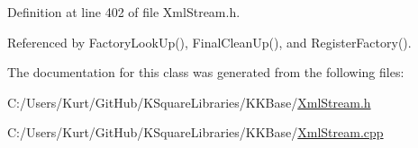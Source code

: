 Definition at line 402 of file Xml\+Stream.\+h.



Referenced by Factory\+Look\+Up(), Final\+Clean\+Up(), and Register\+Factory().



The documentation for this class was generated from the following files\+:\begin{DoxyCompactItemize}
\item 
C\+:/\+Users/\+Kurt/\+Git\+Hub/\+K\+Square\+Libraries/\+K\+K\+Base/\hyperlink{_xml_stream_8h}{Xml\+Stream.\+h}\item 
C\+:/\+Users/\+Kurt/\+Git\+Hub/\+K\+Square\+Libraries/\+K\+K\+Base/\hyperlink{_xml_stream_8cpp}{Xml\+Stream.\+cpp}\end{DoxyCompactItemize}
